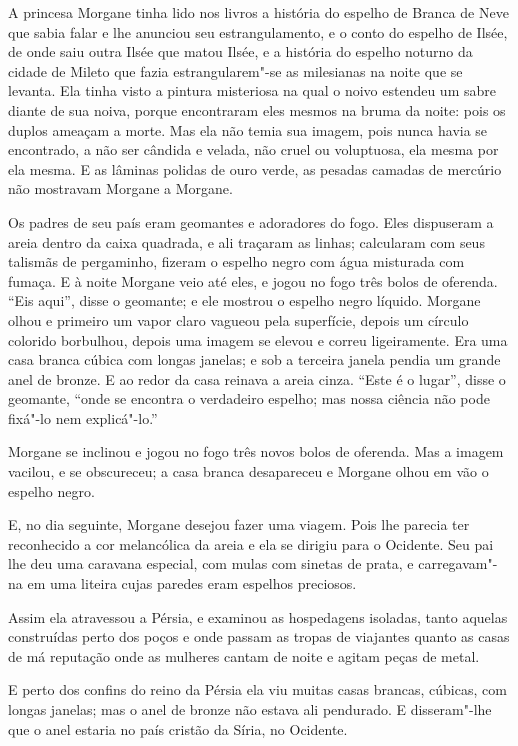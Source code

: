 A princesa Morgane tinha lido nos livros a história do espelho de
Branca de Neve que sabia falar e lhe anunciou seu estrangulamento, e o
conto do espelho de Ilsée, de onde saiu outra Ilsée que matou Ilsée, e a
história do espelho noturno da cidade de Mileto que fazia estrangularem"-se
as milesianas na noite que se levanta. Ela tinha visto a pintura
misteriosa na qual o noivo estendeu um sabre diante de sua noiva, porque
encontraram eles mesmos na bruma da noite: pois os duplos ameaçam a
morte. Mas ela não temia sua imagem, pois nunca havia se encontrado, a não
ser cândida e velada, não cruel ou voluptuosa, ela mesma por ela mesma. E
as lâminas polidas de ouro verde, as pesadas camadas de mercúrio não
mostravam Morgane a Morgane.

Os padres de seu país eram geomantes e adoradores do fogo. Eles
dispuseram a areia dentro da caixa quadrada, e ali traçaram as linhas;
calcularam com seus talismãs de pergaminho, fizeram o espelho negro com
água misturada com fumaça. E à noite Morgane veio até eles, e jogou no
fogo três bolos de oferenda. “Eis aqui”, disse o geomante; e ele mostrou o
espelho negro líquido. Morgane olhou e primeiro um vapor claro vagueou
pela superfície, depois um círculo colorido borbulhou, depois uma imagem
se elevou e correu ligeiramente. Era uma casa branca cúbica com longas
janelas; e sob a terceira janela pendia um grande anel de bronze. E ao
redor da casa reinava a areia cinza. “Este é o lugar'', disse o geomante,
``onde se encontra o verdadeiro espelho; mas nossa ciência não pode fixá"-lo nem
explicá"-lo.”

Morgane se inclinou e jogou no fogo três novos bolos de oferenda. Mas a
imagem vacilou, e se obscureceu; a casa branca desapareceu e Morgane olhou
em vão o espelho negro.

E, no dia seguinte, Morgane desejou fazer uma viagem. Pois lhe parecia
ter reconhecido a cor melancólica da areia e ela se dirigiu para o
Ocidente. Seu pai lhe deu uma caravana especial, com mulas com sinetas de
prata, e carregavam"-na em uma liteira cujas paredes eram espelhos
preciosos.

Assim ela atravessou a Pérsia, e examinou as hospedagens isoladas,
tanto aquelas construídas perto dos poços e onde passam as tropas de
viajantes quanto as casas de má reputação onde as mulheres cantam de noite
e agitam peças de metal.

E perto dos confins do reino da Pérsia ela viu muitas casas brancas,
cúbicas, com longas janelas; mas o anel de bronze não estava ali
pendurado. E disseram"-lhe que o anel estaria no país cristão da Síria, no
Ocidente.


